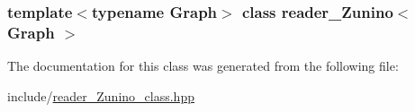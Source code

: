 \subsubsection*{template$<$typename Graph$>$ class reader\_\-Zunino$<$ Graph $>$}



The documentation for this class was generated from the following file:\begin{DoxyCompactItemize}
\item 
include/\hyperlink{reader__Zunino__class_8hpp}{reader\_\-Zunino\_\-class.hpp}\end{DoxyCompactItemize}
